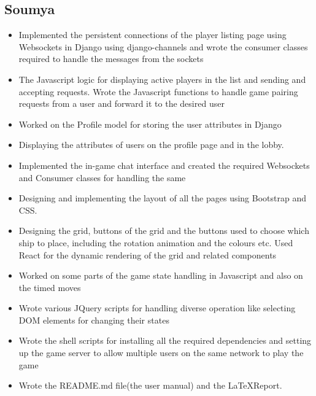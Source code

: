 \documentclass[titlepage]{article}
\begin{document}
\subsection{Soumya}
    \begin{itemize}
        \item Implemented the persistent connections of the player listing page using Websockets in Django using django-channels and wrote the consumer classes required to handle the messages from the sockets
        \item The Javascript logic for displaying active players in the list and sending and accepting requests. Wrote the Javascript functions to handle game pairing requests from a user and forward it to the desired user
        \item Worked on the Profile model for storing the user attributes in Django
        \item Displaying the attributes of users on the profile page and in the lobby.
        \item Implemented the in-game chat interface and created the required Websockets and Consumer classes for handling the same
        \item Designing and implementing the layout of all the pages using Bootstrap and CSS.
        \item Designing the grid, buttons of the grid and the buttons used to choose which ship to place, including the rotation animation and the colours etc. Used React for the dynamic rendering of the grid and related components
        \item Worked on some parts of the game state handling in Javascript and also on the timed moves
        \item Wrote various JQuery scripts for handling diverse operation like selecting DOM elements for changing their states
        \item Wrote the shell scripts for installing all the required dependencies and setting up the game server to allow multiple users on the same network to play the game
        \item Wrote the README.md file(the user manual) and the \LaTeX\space Report.
    \end{itemize}
\end{document}
